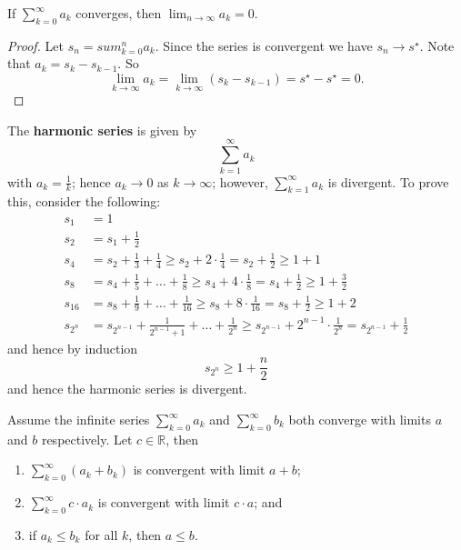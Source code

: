 \begin{lemma}
    If $\sum_{k = 0}^\infty a_k$ converges, then $\lim_{n \to \infty} a_k = 0$.
\end{lemma}

\begin{proof}
    Let $s_n = sum_{k = 0}^n a_k$. Since the series is  convergent we have $s_n \to s^\star$. Note that $a_k = s_k - s_{k - 1}$. So \[ \lim_{k \to \infty} a_k = \lim_{k \to \infty} (s_k - s_{k - 1}) = s^\star - s^\star = 0. \tag{COLT} \]
\end{proof}

\begin{example}
    The \textbf{harmonic series} is given by \[ \sum_{k = 1}^\infty a_k \] with $a_k = \frac1k$; hence $a_k \to 0$ as $k \to \infty$; however, $\sum_{k = 1}^\infty a_k$ is divergent. To prove this, consider the following:
    \begin{align*}
        s_1 &= 1 \\
        s_2 &= s_1 + \frac12 \\
        s_4 &= s_2 + \frac13 + \frac14 \geq s_2 + 2 \cdot \frac14 = s_2 + \frac12 \geq 1 + 1 \\
        s_8 &= s_4 + \frac15 + \ldots + \frac18 \geq s_4 + 4 \cdot \frac18 = s_4 + \frac12 \geq 1 + \frac32 \\
        s_{16} &= s_8 + \frac19 + \ldots + \frac1{16} \geq s_8 + 8 \cdot \frac1{16} = s_8 + \frac12 \geq 1 + 2 \\
        s_{2^n} &= s_{2^{n - 1}} + \frac{1}{2^{n - 1} + 1} + \ldots + \frac{1}{2^n} \geq s_{2^{n-1}} + 2^{n - 1} \cdot \frac{1}{2^n} = s_{2^{n-1}} + \frac12
    \end{align*}
    and hence by induction \[ s_{2^n} \geq 1 + \frac n2 \] and hence the harmonic series is divergent.
\end{example}

\begin{theorem}
    Assume the infinite series $\sum_{k = 0}^\infty a_k$ and $\sum_{k = 0}^\infty b_k$ both converge with limits $a$ and $b$ respectively. Let $c \in \mathbb R$, then
    \begin{enumerate}
        \item $\sum_{k = 0}^\infty (a_k + b_k)$ is convergent with limit $a + b$;
        \item $\sum_{k = 0}^\infty c \cdot a_k$ is convergent with limit $c \cdot a$; and
        \item if $a_k \leq b_k$ for all $k$, then $a \leq b$.
    \end{enumerate}
\end{theorem}


